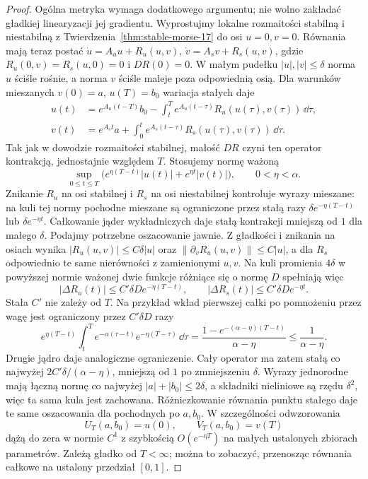 \begin{proof}
Ogólna metryka wymaga dodatkowego argumentu;
nie wolno zakładać gładkiej linearyzacji jej gradientu.
Wyprostujmy lokalne rozmaitości stabilną i niestabilną
z Twierdzenia~\ref{thm:stable-morse-17} do osi $u=0,v=0$.
Równania mają teraz postać
$\dot u=A_uu+R_u(u,v)$, $\dot v=A_sv+R_s(u,v)$,
gdzie $R_u(0,v)=R_s(u,0)=0$ i $DR(0)=0$.
W małym pudełku $|u|,|v|\leq\delta$ norma $u$
ściśle rośnie, a norma $v$ ściśle maleje poza odpowiednią osią.
Dla warunków mieszanych $v(0)=a$, $u(T)=b_0$
wariacja stałych daje
\begin{align*}
 u(t)&=e^{A_u(t-T)}b_0-
       \int_t^T e^{A_u(t-\tau)}R_u(u(\tau),v(\tau))\,\dd\tau,\\
 v(t)&=e^{A_st}a+
       \int_0^t e^{A_s(t-\tau)}R_s(u(\tau),v(\tau))\,\dd\tau.
\end{align*}
Tak jak w dowodzie rozmaitości stabilnej,
małość $DR$ czyni ten operator kontrakcją,
jednostajnie względem $T$.
Stosujemy normę ważoną
\[
 \sup_{0\leq t\leq T}
 \bigl(e^{\eta(T-t)}|u(t)|+e^{\eta t}|v(t)|\bigr),
 \qquad 0<\eta<\alpha.
\]
Znikanie $R_u$ na osi stabilnej i $R_s$ na osi
niestabilnej kontroluje wyrazy mieszane: na kuli
tej normy pochodne mieszane są ograniczone przez
stałą razy $\delta e^{-\eta(T-t)}$ lub
$\delta e^{-\eta t}$. Całkowanie jąder wykładniczych
daje stałą kontrakcji mniejszą od $1$ dla małego $\delta$.
Podajmy potrzebne oszacowanie jawnie.
Z gładkości i znikania na osiach wynika
$|R_u(u,v)|\leq C\delta|u|$ oraz
$\|\partial_vR_u(u,v)\|\leq C|u|$,
a dla $R_s$ odpowiednio te same nierówności z zamienionymi $u,v$.
Na kuli promienia $4\delta$ w powyższej normie ważonej
dwie funkcje różniące się o normę $D$ spełniają więc
\[
 |\Delta R_u(t)|\leq C'\delta D e^{-\eta(T-t)},\qquad
 |\Delta R_s(t)|\leq C'\delta D e^{-\eta t}.
\]
Stała $C'$ nie zależy od $T$.
Na przykład wkład pierwszej całki po pomnożeniu przez wagę
jest ograniczony przez $C'\delta D$ razy
\[
 e^{\eta(T-t)}\int_t^T
 e^{-\alpha(\tau-t)}e^{-\eta(T-\tau)}\,\dd\tau
 =\frac{1-e^{-(\alpha-\eta)(T-t)}}{\alpha-\eta}
 \leq\frac1{\alpha-\eta}.
\]
Drugie jądro daje analogiczne ograniczenie.
Cały operator ma zatem stałą co najwyżej
$2C'\delta/(\alpha-\eta)$, mniejszą od $1$ po zmniejszeniu $\delta$.
Wyrazy jednorodne mają łączną normę co najwyżej
$|a|+|b_0|\leq2\delta$, a składniki nieliniowe są rzędu $\delta^2$,
więc ta sama kula jest zachowana.
Różniczkowanie równania punktu stałego daje
te same oszacowania dla pochodnych po $a,b_0$.
W szczególności odwzorowania
\[
 U_T(a,b_0)=u(0),\qquad V_T(a,b_0)=v(T)
\]
dążą do zera w normie $C^1$ z szybkością
$O(e^{-\eta T})$ na małych ustalonych zbiorach parametrów.
Zależą gładko od $T<\infty$; można to zobaczyć,
przenosząc równania całkowe na ustalony przedział $[0,1]$.


\end{proof}
